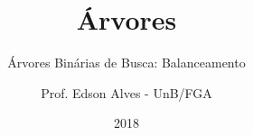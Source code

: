 \title{Árvores}
\subtitle{Árvores Binárias de Busca: Balanceamento}
\author{Prof. Edson Alves - UnB/FGA}
\date{2018}
